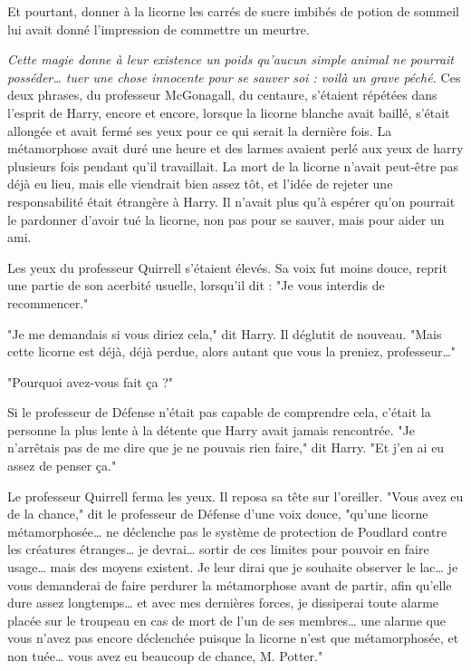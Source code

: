 Et pourtant, donner à la licorne les carrés de sucre imbibés de potion de sommeil lui avait donné l'impression de commettre un meurtre.

\emph{Cette magie donne à leur existence un poids qu'aucun simple animal ne pourrait posséder… tuer une chose innocente pour se sauver soi : voilà un grave péché.}  Ces deux phrases, du professeur McGonagall, du centaure, s'étaient répétées dans l'esprit de Harry, encore et encore, lorsque la licorne blanche avait baillé, s'était allongée et avait fermé ses yeux pour ce qui serait la dernière fois. La métamorphose avait duré une heure et des larmes avaient perlé aux yeux de harry plusieurs fois pendant qu'il travaillait. La mort de la licorne n'avait peut-être pas déjà eu lieu, mais elle viendrait bien assez tôt, et l'idée de rejeter une responsabilité était étrangère à Harry. Il n'avait plus qu'à espérer qu'on pourrait le pardonner d'avoir tué la licorne, non pas pour se sauver, mais pour aider un ami.

Les yeux du professeur Quirrell s'étaient élevés. Sa voix fut moins douce, reprit une partie de son acerbité usuelle, lorsqu'il dit : "Je vous interdis de recommencer."

"Je me demandais si vous diriez cela," dit Harry. Il déglutit de nouveau. "Mais cette licorne est déjà, déjà perdue, alors autant que vous la preniez, professeur…"

"Pourquoi avez-vous fait ça ?"

Si le professeur de Défense n'était pas capable de comprendre cela, c'était la personne la plus lente à la détente que Harry avait jamais rencontrée. "Je n'arrêtais pas de me dire que je ne pouvais rien faire," dit Harry. "Et j'en ai eu assez de penser ça."

Le professeur Quirrell ferma les yeux. Il reposa sa tête sur l'oreiller. "Vous avez eu de la chance," dit le professeur de Défense d'une voix douce, "qu'une licorne métamorphosée… ne déclenche pas le système de protection de Poudlard contre les créatures étranges… je devrai… sortir de ces limites pour pouvoir en faire usage… mais des moyens existent. Je leur dirai que je souhaite observer le lac… je vous demanderai de faire perdurer la métamorphose avant de partir, afin qu'elle dure assez longtemps… et avec mes dernières forces, je dissiperai toute alarme placée sur le troupeau en cas de mort de l'un de ses membres… une alarme que vous n'avez pas encore déclenchée puisque la licorne n'est que métamorphosée, et non tuée… vous avez eu beaucoup de chance, M. Potter."

